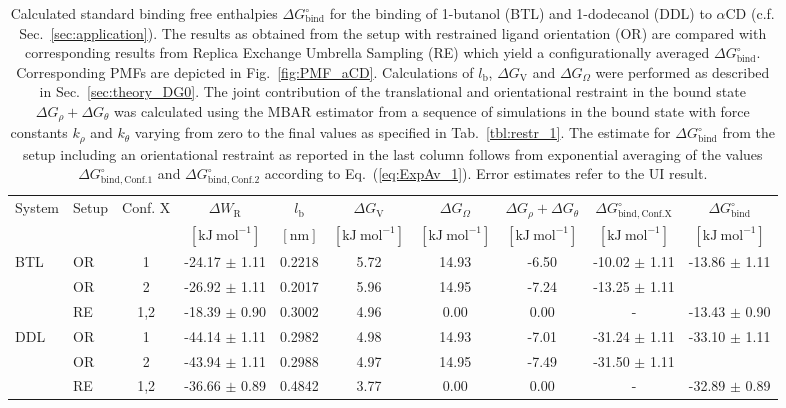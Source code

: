 \documentclass[9pt,lessons]{livecoms}
\begin{document}
\begin{table}[ht]
\caption{\label{tbl:aCD} 
Calculated standard binding free enthalpies $\Delta G^\circ_\mathrm{bind}$ for the binding of 1-butanol (BTL) and 1-dodecanol (DDL) to $\alpha$CD (c.f. Sec.~\ref{sec:application}).
The results as obtained from the setup with restrained ligand orientation (OR) are compared with corresponding results from Replica Exchange Umbrella Sampling (RE) which yield a configurationally averaged 
$\Delta G^\circ_\mathrm{bind}$. 
Corresponding PMFs are depicted in Fig.~\ref{fig:PMF_aCD}. 
Calculations of $l_\mathrm{b}$,  $\Delta G_\mathrm{V}$ and $\Delta G_\Omega$ were performed as described in Sec.~\ref{sec:theory_DG0}. 
The joint contribution of the translational and orientational restraint in the bound state $\Delta G_\rho + \Delta G_\theta$ was calculated using the MBAR estimator from a sequence of simulations in the bound state with force constants $k_\rho$ and $k_\theta$ varying from zero to the final values as specified in Tab.~\ref{tbl:restr_1}.
The estimate for $\Delta G^\circ_\mathrm{bind}$ from the setup including an orientational restraint as reported in the last column follows from 
exponential averaging of the values $\Delta G^\circ_\mathrm{bind, Conf. 1}$ and $\Delta G^\circ_\mathrm{bind, Conf. 2}$ according to Eq.~(\ref{eq:ExpAv_1}).
Error estimates refer to the UI result.
}
\centering
\begin{tabular}{llcc ccc ccc}\hline
System & Setup & Conf. X & $\Delta W_\mathrm{R}$  & $l_\mathrm{b}$ & $\Delta G_\mathrm{V}$ & $\Delta G_\Omega$ & 
$\Delta G_\rho + \Delta G_\theta$ & $\Delta G^\circ_\mathrm{bind, Conf. X}$ & $\Delta G^\circ_\mathrm{bind}$ \\
& & & $[\mathrm{kJ~mol}^{-1}]$ & $[\mathrm{nm}]$ &  $[\mathrm{kJ~mol}^{-1}]$ & $[\mathrm{kJ~mol}^{-1}]$ & $[\mathrm{kJ~mol}^{-1}]$ & $[\mathrm{kJ~mol}^{-1}]$ & $[\mathrm{kJ~mol}^{-1}]$ \\ 
\hline
\multirow{ 3}{*}{BTL} & OR & 1 & -24.17 $\pm$ 1.11 & 0.2218 &  5.72 &  14.93 &  -6.50 &  -10.02 $\pm$ 1.11  & \multirow{ 2}{*}{-13.86 $\pm$ 1.11 } \\   
				& OR & 2 & -26.92 $\pm$ 1.11 & 0.2017  &  5.96 &  14.95 &  -7.24 &  -13.25 $\pm$ 1.11  \\
				& RE &1,2 & -18.39 $\pm$ 0.90 & 0.3002  &  4.96 &  0.00 &  0.00 &  - & -13.43 $\pm$ 0.90 \\ 
\hline
\multirow{ 3}{*}{DDL} & OR & 1 & -44.14 $\pm$ 1.11 & 0.2982  &  4.98 &  14.93 &  -7.01 &  -31.24 $\pm$ 1.11  & \multirow{ 2}{*}{-33.10 $\pm$ 1.11 } \\    
				& OR & 2 & -43.94 $\pm$ 1.11 & 0.2988   &  4.97 &  14.95 &  -7.49 &  -31.50 $\pm$ 1.11  \\
				& RE &1,2 & -36.66 $\pm$ 0.89 & 0.4842  &  3.77 &  0.00  &  0.00 &  - & -32.89 $\pm$ 0.89 \\ 
\hline
\end{tabular}
\end{table}
\end{document}
